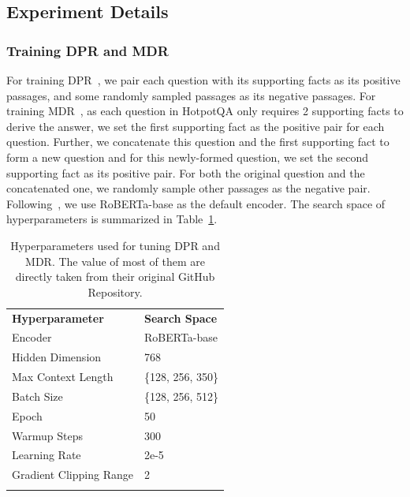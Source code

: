 \subsection{Experiment Details}\label{sup-exprdetail}
\subsubsection{Training DPR and MDR}
For training DPR~\cite{karpukhin2020dense}, we pair each question with its supporting facts as its positive passages, and some randomly sampled passages as its negative passages. For training MDR~\cite{xiong2020answering}, as each question in HotpotQA only requires 2 supporting facts to derive the answer, we set the first supporting fact as the positive pair for each question. Further, we concatenate this question and the first supporting fact to form a new question and for this newly-formed question, we set the second supporting fact as its positive pair. For both the original question and the concatenated one, we randomly sample other passages as the negative pair. Following~\cite{xiong2020answering, karpukhin2020dense}, we use RoBERTa-base as the default encoder. The search space of hyperparameters is summarized in Table~\ref{sup-tab-hyper-mdrdpr}.

\begin{table}[htbp!] 
\vspace{-1ex}
\footnotesize
\setlength{\extrarowheight}{0.5pt}
\setlength\tabcolsep{3pt}
\caption{Hyperparameters used for tuning DPR and MDR. The value of most of them are directly taken from their original GitHub Repository.}
\vspace{-2ex}
\label{sup-tab-hyper-mdrdpr}
\begin{center}
\begin{tabular}{m{13em} m{13em}}
\Xhline{2\arrayrulewidth}
\textbf{Hyperparameter} &  \textbf{Search Space}\\
\Xhline{2\arrayrulewidth}
Encoder & RoBERTa-base\\
Hidden Dimension & 768\\
Max Context Length & \{128, 256, 350\}\\
Batch Size & \{128, 256, 512\}\\
Epoch & 50\\
Warmup Steps & 300 \\
Learning Rate & 2e-5 \\
Gradient Clipping Range & 2 \\
\Xhline{2\arrayrulewidth}
\end{tabular}
\end{center}
\end{table}



